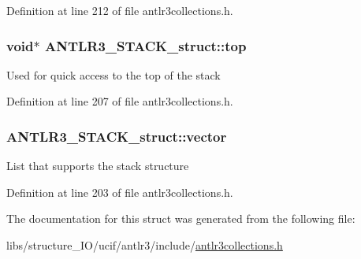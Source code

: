 Definition at line 212 of file antlr3collections.\-h.

\hypertarget{struct_a_n_t_l_r3___s_t_a_c_k__struct_abffbd077b5ad2c498fc0aeca3036c5a2}{
\subsubsection[{top}]{\setlength{\rightskip}{0pt plus 5cm}void$\ast$ A\-N\-T\-L\-R3\-\_\-\-S\-T\-A\-C\-K\-\_\-struct\-::top}}\label{struct_a_n_t_l_r3___s_t_a_c_k__struct_abffbd077b5ad2c498fc0aeca3036c5a2}
Used for quick access to the top of the stack 

Definition at line 207 of file antlr3collections.\-h.

\hypertarget{struct_a_n_t_l_r3___s_t_a_c_k__struct_afc4ca6a2df0cf655ead002acc60936d1}{
\subsubsection[{vector}]{ A\-N\-T\-L\-R3\-\_\-\-S\-T\-A\-C\-K\-\_\-struct\-::vector}}\label{struct_a_n_t_l_r3___s_t_a_c_k__struct_afc4ca6a2df0cf655ead002acc60936d1}
List that supports the stack structure 

Definition at line 203 of file antlr3collections.\-h.



The documentation for this struct was generated from the following file\-:\begin{DoxyCompactItemize}
\item 
libs/structure\-\_\-\-I\-O/ucif/antlr3/include/\hyperlink{antlr3collections_8h}{antlr3collections.\-h}\end{DoxyCompactItemize}
